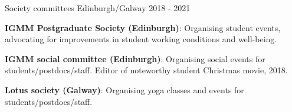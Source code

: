 
\begin{cventries}

 {
  Society committees
} {
  Edinburgh/Galway
} {
  2018 - 2021
} {
  \begin{cvitems}
    \item
      \textbf{IGMM Postgraduate Society (Edinburgh)}: Organising student events, advocating 
      for improvements in student working conditions and well-being.
    \item
      \textbf{IGMM social committee (Edinburgh)}:
      Organising social events for students/postdocs/staff.
      Editor of noteworthy student Christmas movie, 2018.
    \item
      \textbf{Lotus society (Galway)}: Organising yoga classes and events for
      students/postdocs/staff.
  \end{cvitems}
}





\end{cventries}

